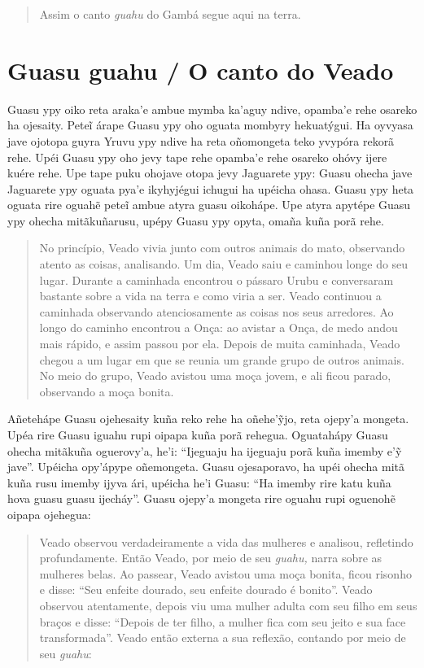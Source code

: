 \begin{itemize}
\begin{quote}
Assim o canto \emph{guahu} do Gambá segue aqui na terra.
\end{quote}

\chapter{Guasu guahu / O canto do Veado}

Guasu ypy oiko reta araka'e ambue mymba ka'aguy ndive, opamba'e rehe
osareko ha ojesaity. Peteĩ árape Guasu ypy oho oguata mombyry
hekuatýgui. Ha oyvyasa jave ojotopa guyra Yruvu ypy ndive ha reta
oñomongeta teko yvypóra rekorã rehe. Upéi Guasu ypy oho jevy tape rehe
opamba'e rehe osareko ohóvy ijere kuére rehe. Upe tape puku ohojave
otopa jevy Jaguarete ypy: Guasu ohecha jave Jaguarete ypy oguata pya'e
ikyhyjégui ichugui ha upéicha ohasa. Guasu ypy heta oguata rire oguahẽ
peteĩ ambue atyra guasu oikohápe. Upe atyra apytépe Guasu ypy ohecha
mitãkuñarusu, upépy Guasu ypy opyta, omaña kuña porã rehe.

\begin{quote}
No princípio, Veado vivia junto com outros animais do mato, observando
atento as coisas, analisando. Um dia, Veado saiu e caminhou longe do seu
lugar. Durante a caminhada encontrou o pássaro Urubu e conversaram
bastante sobre a vida na terra e como viria a ser. Veado continuou a
caminhada observando atenciosamente as coisas nos seus arredores. Ao
longo do caminho encontrou a Onça: ao avistar a Onça, de medo andou mais
rápido, e assim passou por ela. Depois de muita caminhada, Veado chegou
a um lugar em que se reunia um grande grupo de outros animais. No meio
do grupo, Veado avistou uma moça jovem, e ali ficou parado, observando a
moça bonita.
\end{quote}

Añetehápe Guasu ojehesaity kuña reko rehe ha oñehe'ỹjo, reta ojepy'a
mongeta. Upéa rire Guasu iguahu rupi oipapa kuña porã rehegua.
Oguatahápy Guasu ohecha mitãkuña oguerovy'a, he'i: ``Ijeguaju ha
ijeguaju porã kuña imemby e'ỹ jave''. Upéicha opy'ápype oñemongeta.
Guasu ojesaporavo, ha upéi ohecha mitã kuña rusu imemby ijyva ári,
upéicha he'i Guasu: ``Ha imemby rire katu kuña hova guasu guasu
ijecháy''. Guasu ojepy'a mongeta rire oguahu rupi oguenohẽ oipapa
ojehegua:

\begin{quote}
Veado observou verdadeiramente a vida das mulheres e analisou,
refletindo profundamente. Então Veado, por meio de seu \emph{guahu,}
narra sobre as mulheres belas. Ao passear, Veado avistou uma moça
bonita, ficou risonho e disse: ``Seu enfeite dourado, seu enfeite
dourado é bonito''. Veado observou atentamente, depois viu uma mulher
adulta com seu filho em seus braços e disse: ``Depois de ter filho, a
mulher fica com seu jeito e sua face transformada''. Veado então externa
a sua reflexão, contando por meio de seu \emph{guahu}:
\end{quote}


\end{itemize}
